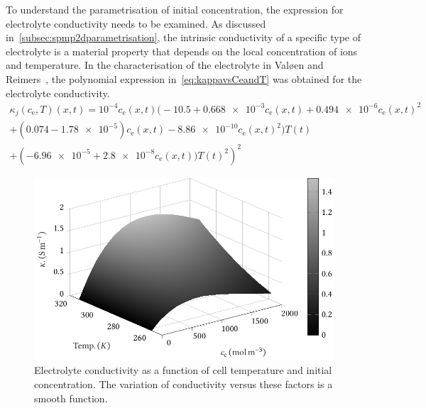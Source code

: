 To  understand  the parametrisation  of  initial  concentration, the  expression
for   electrolyte   conductivity   needs    to   be   examined.   As   discussed
in~\cref{subsec:spmp2dparametrisation}, the intrinsic conductivity of a specific
type  of  electrolyte  is  a  material   property  that  depends  on  the  local
concentration of  ions and  temperature. In the characterisation of the
electrolyte in Valøen and  Reimers~\cite{Valoen2005}, the polynomial expression
in~\cref{eq:kappavsCeandT} was obtained for the electrolyte conductivity.
\begin{multline}\label{eq:kappavsCeandT}
    \kappa_j(c_\text{e},T)(x,t) =  10^{-4} c_\text{e}(x,t) \bigl(-10.5 + \num{0.668e-3} c_\text{e}(x,t) + \num{0.494e-6}  c_\text{e}{(x,t)}^2\\
    + (0.074 - \num{1.78e-5}) c_\text{e}(x,t) - \num{8.86e-10} c_\text{e}{(x,t)}^2 \bigr)T(t)\\
	+ \left(\num{-6.96e-5} + \num{2.8e-8} c_\text{e}{(x,t)})T(t)^2\right)^2
\end{multline}

\begin{figure}[!htb]
    \centering
    \includegraphics{4/figures/m2t_kappa_ce_T.pdf}
    \caption[Surface plot of electrolyte conductivity]
    {Electrolyte conductivity as a function of cell temperature and initial
        concentration. The variation of conductivity versus these factors is a
    smooth function.}
    \label{fig:kappavsCeandT}
\end{figure}

